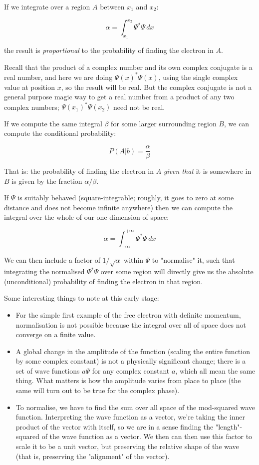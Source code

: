If we integrate over a region $A$ between $x_1$ and $x_2$:

$$
\alpha =
\int_{x_1}^{x_2}
\Psi^*\Psi
\,dx
$$

the result is \textit{proportional} to the probability of finding the electron in $A$.

Recall that the product of a complex number and its own complex conjugate is a real number, and here we are doing $\Psi(x)^*\Psi(x)$, using the single complex value at position $x$, so the result will be real. But the complex conjugate is not a general purpose magic way to get a real number from a product of any two complex numbers; $\Psi(x_1)^*\Psi(x_2)$ need not be real.

If we compute the same integral $\beta$ for some larger surrounding region $B$, we can compute the conditional probability:

$$
P(A|b) = \frac{\alpha}{\beta}
$$

That is: the probability of finding the electron in $A$ \textit{given that} it is somewhere in $B$ is given by the fraction $\alpha / \beta$.

If $\Psi$ is suitably behaved (square-integrable; roughly, it goes to zero at some distance and does not become infinite anywhere) then we can compute the integral over the whole of our one dimension of space:

$$
\alpha =
\int_{-\infty}^{+\infty}
\Psi^*\Psi
\,dx
$$

We can then include a factor of $1/\sqrt{\alpha}$ within $\Psi$ to "normalise" it, such that integrating the normalised $\Psi^*\Psi$ over some region will directly give us the absolute (unconditional) probability of finding the electron in that region.

Some interesting things to note at this early stage:

\begin{itemize}
  \item For the simple first example of the free electron with definite momentum, normalisation is not possible because the integral over all of space does not converge on a finite value.
  \item A global change in the amplitude of the function (scaling the entire function by some complex constant) is not a physically significant change; there is a set of wave functions $a\Psi$ for any complex constant $a$, which all mean the same thing. What matters is how the amplitude varies from place to place (the same will turn out to be true for the complex phase).
  \item To normalise, we have to find the sum over all space of the mod-squared wave function. Interpreting the wave function as a vector, we're taking the inner product of the vector with itself, so we are in a sense finding the "length"-squared of the wave function as a vector. We then can then use this factor to scale it to be a unit vector, but preserving the relative shape of the wave (that is, preserving the "alignment" of the vector).
\end{itemize}

